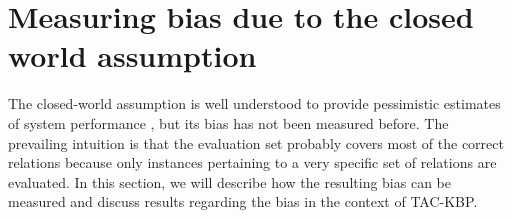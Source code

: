\section{Measuring bias due to the closed world assumption}
\label{sec:analysis}


The closed-world assumption is well understood to provide pessimistic estimates of system performance , but its bias has not been measured before.
The prevailing intuition is that the evaluation set probably covers most of the correct relations because only instances pertaining to a very specific set of relations are evaluated.
In this section, we will describe how the resulting bias can be measured and discuss results regarding the bias in the context of TAC-KBP.\@


